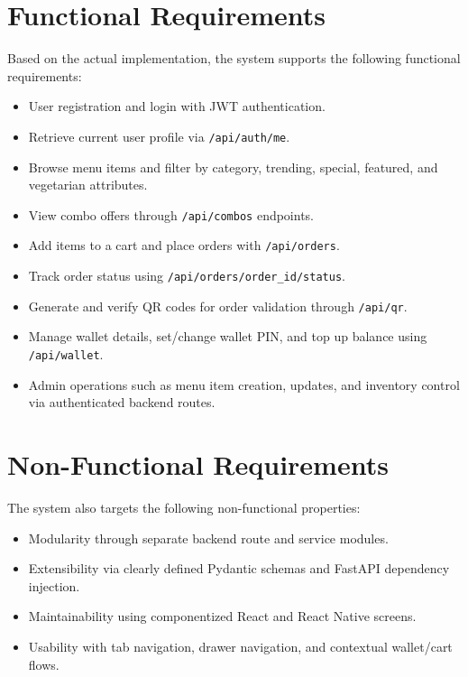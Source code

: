 \documentclass[12pt,a4paper]{report}
\begin{document}
\section{Functional Requirements}
Based on the actual implementation, the system supports the following functional requirements:
\begin{itemize}
  \item User registration and login with JWT authentication.
  \item Retrieve current user profile via \texttt{/api/auth/me}.
  \item Browse menu items and filter by category, trending, special, featured, and vegetarian attributes.
  \item View combo offers through \texttt{/api/combos} endpoints.
  \item Add items to a cart and place orders with \texttt{/api/orders}.
  \item Track order status using \texttt{/api/orders/{order_id}/status}.
  \item Generate and verify QR codes for order validation through \texttt{/api/qr}.
  \item Manage wallet details, set/change wallet PIN, and top up balance using \texttt{/api/wallet}.
  \item Admin operations such as menu item creation, updates, and inventory control via authenticated backend routes.
\end{itemize}

\section{Non-Functional Requirements}
The system also targets the following non-functional properties:
\begin{itemize}
  \item Modularity through separate backend route and service modules.
  \item Extensibility via clearly defined Pydantic schemas and FastAPI dependency injection.
  \item Maintainability using componentized React and React Native screens.
  \item Usability with tab navigation, drawer navigation, and contextual wallet/cart flows.
\end{itemize}
\end{document}
